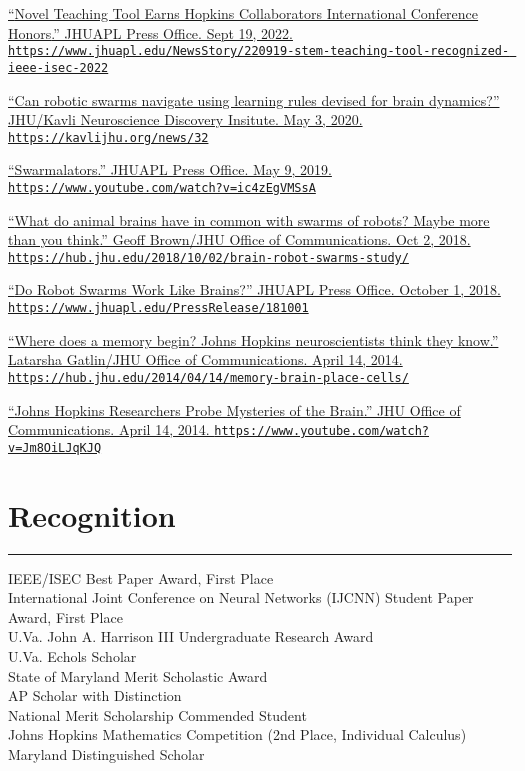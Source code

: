 \documentclass[10pt]{article}
\newcommand{\itemtitle}[1]{{\color{hopkinsblue}\ul{#1}}}
\newcommand{\aurl}[1]{{\color{dimgray}\texttt{#1}}}
\newcommand{\lefttabline}[3]{\hspace{2ex}\makebox[#1][l]{#2} #3\\}
\newcommand{\newsection}[2]{%
  \section*{#1}
  \vspace{-.125in}
  \hrule
  \vspace{.22in}
  \label{sec:#2}
}
\begin{document}
\begin{description}
  \item \href{https://www.jhuapl.edu/NewsStory/220919-stem-teaching-tool-recognized-ieee-isec-2022}{
      ``\itemtitle{Novel Teaching Tool Earns Hopkins Collaborators
      International Conference Honors}.'' JHUAPL Press Office. Sept 19, 2022.
      \aurl{https://www.jhuapl.edu/NewsStory/220919-stem-teaching-tool-recognized- ieee-isec-2022}}
  \item \href{https://kavlijhu.org/news/32} {``\itemtitle{Can
        robotic swarms navigate using learning rules devised for brain
      dynamics?}'' JHU/Kavli Neuroscience Discovery Insitute. May 3, 2020.
    \aurl{https://kavlijhu.org/news/32}}
  \item \href{https://www.youtube.com/watch?v=ic4zEgVMSsA}
    {``\itemtitle{Swarmalators}.'' JHUAPL Press Office. May 9, 2019.
    \aurl{https://www.youtube.com/watch?v=ic4zEgVMSsA}}
  \item \href{https://hub.jhu.edu/2018/10/02/brain-robot-swarms-study/}
    {``\itemtitle{What do animal brains have in common with swarms of robots?
      Maybe more than you think}.'' Geoff Brown/JHU Office of Communications. Oct 2,
    2018. \aurl{https://hub.jhu.edu/2018/10/02/brain-robot-swarms-study/}}
  \item \href{https://www.jhuapl.edu/PressRelease/181001}
    {``\itemtitle{Do Robot Swarms Work Like Brains?}'' JHUAPL Press Office. October 1, 2018.
    \aurl{https://www.jhuapl.edu/PressRelease/181001}}
  \item \href{https://hub.jhu.edu/2014/04/14/memory-brain-place-cells/}
    {``\itemtitle{Where does a memory begin? Johns Hopkins neuroscientists think they
      know}.'' Latarsha Gatlin/JHU Office of Communications. April 14, 2014.
    \aurl{https://hub.jhu.edu/2014/04/14/memory-brain-place-cells/}}
  \item \href{https://www.youtube.com/watch?v=Jm8OiLJqKJQ}
    {``\itemtitle{Johns Hopkins Researchers Probe Mysteries of
      the Brain}.'' JHU Office of Communications. April 14, 2014.
    \aurl{https://www.youtube.com/watch?v=Jm8OiLJqKJQ}}
\end{description}


\smallskip
\newsection{Recognition}{awards}

\lefttabline{0.8in}{2022}{IEEE/ISEC Best Paper Award, First Place}
\lefttabline{0.8in}{2003}{International Joint Conference on Neural Networks (IJCNN) Student Paper Award, First Place}
\lefttabline{0.8in}{2002}{U.Va. John A. Harrison III Undergraduate Research Award}
\lefttabline{0.8in}{1999--2003}{U.Va. Echols Scholar}
\lefttabline{0.8in}{1999}{State of Maryland Merit Scholastic Award}
\lefttabline{0.8in}{1999}{AP Scholar with Distinction}
\lefttabline{0.8in}{1999}{National Merit Scholarship Commended Student}
\lefttabline{0.8in}{1999}{Johns Hopkins Mathematics Competition (2nd Place, Individual Calculus)}
\lefttabline{0.8in}{1999}{Maryland Distinguished Scholar}
\end{document}
